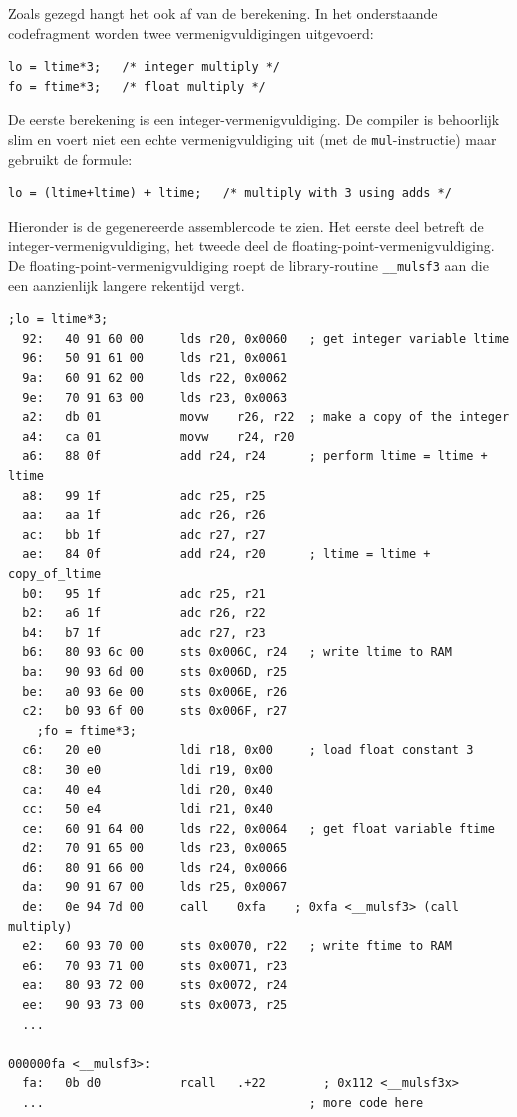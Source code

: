 \documentclass[12pt,a4paper,final,twoside,fleqn]{article}
\def\lstC{\lstinline[style=C]}
\def\lstAVR{\lstinline[style=AVR]}
\begin{document}
Zoals gezegd hangt het ook af van de berekening. In het onderstaande codefragment worden
twee vermenigvuldigingen uitgevoerd:

\begin{lstlisting}[style=C]
lo = ltime*3;   /* integer multiply */
fo = ftime*3;   /* float multiply */
\end{lstlisting}

De eerste berekening is een integer-vermenigvuldiging. De compiler is behoorlijk slim
en voert niet een echte vermenigvuldiging uit (met de \lstAVR{mul}-instructie) maar
gebruikt de formule:

\begin{lstlisting}[style=C]
lo = (ltime+ltime) + ltime;   /* multiply with 3 using adds */
\end{lstlisting}

Hieronder is de gegenereerde assemblercode te zien. Het eerste deel betreft de
integer-vermenigvuldiging, het tweede deel de floating-point-vermenigvuldiging.
De floating-point-vermenigvuldiging roept de library-routine \lstC{__mulsf3} aan die
een aanzienlijk langere rekentijd vergt.

\begin{lstlisting}[style=AVR,caption=Assemblercode van integer en float vermenigvuldigingen met 3.]
	;lo = ltime*3;
  92:	40 91 60 00 	lds	r20, 0x0060   ; get integer variable ltime
  96:	50 91 61 00 	lds	r21, 0x0061
  9a:	60 91 62 00 	lds	r22, 0x0062
  9e:	70 91 63 00 	lds	r23, 0x0063
  a2:	db 01       	movw	r26, r22  ; make a copy of the integer
  a4:	ca 01       	movw	r24, r20
  a6:	88 0f       	add	r24, r24      ; perform ltime = ltime + ltime
  a8:	99 1f       	adc	r25, r25
  aa:	aa 1f       	adc	r26, r26
  ac:	bb 1f       	adc	r27, r27
  ae:	84 0f       	add	r24, r20      ; ltime = ltime + copy_of_ltime
  b0:	95 1f       	adc	r25, r21
  b2:	a6 1f       	adc	r26, r22
  b4:	b7 1f       	adc	r27, r23
  b6:	80 93 6c 00 	sts	0x006C, r24   ; write ltime to RAM
  ba:	90 93 6d 00 	sts	0x006D, r25
  be:	a0 93 6e 00 	sts	0x006E, r26
  c2:	b0 93 6f 00 	sts	0x006F, r27
	;fo = ftime*3;
  c6:	20 e0       	ldi	r18, 0x00	  ; load float constant 3
  c8:	30 e0       	ldi	r19, 0x00
  ca:	40 e4       	ldi	r20, 0x40
  cc:	50 e4       	ldi	r21, 0x40
  ce:	60 91 64 00 	lds	r22, 0x0064   ; get float variable ftime
  d2:	70 91 65 00 	lds	r23, 0x0065
  d6:	80 91 66 00 	lds	r24, 0x0066
  da:	90 91 67 00 	lds	r25, 0x0067
  de:	0e 94 7d 00 	call	0xfa	; 0xfa <__mulsf3> (call multiply)
  e2:	60 93 70 00 	sts	0x0070, r22   ; write ftime to RAM
  e6:	70 93 71 00 	sts	0x0071, r23
  ea:	80 93 72 00 	sts	0x0072, r24
  ee:	90 93 73 00 	sts	0x0073, r25
  ...

000000fa <__mulsf3>:
  fa:	0b d0       	rcall	.+22     	; 0x112 <__mulsf3x>
  ...                                     ; more code here
\end{lstlisting}
\end{document}

